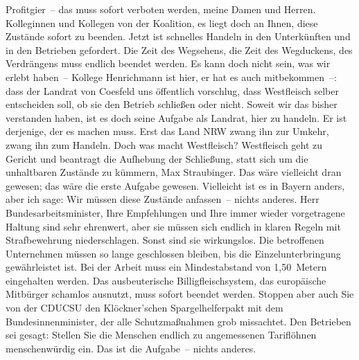 \documentclass{article}
\begin{document}
Profitgier – das muss sofort verboten werden, meine Damen und Herren.  Kolleginnen und Kollegen von der Koalition, es liegt doch an Ihnen, diese Zustände sofort zu beenden.  Jetzt ist schnelles Handeln in den Unterkünften und in den Betrieben gefordert. Die Zeit des Wegsehens, die Zeit des Wegduckens, des Verdrängens muss endlich beendet werden.  Es kann doch nicht sein, was wir erlebt haben – Kollege Henrichmann ist hier, er hat es auch mitbekommen –: dass der Landrat von Coesfeld uns öffentlich vorschlug, dass Westfleisch selber entscheiden soll, ob sie den Betrieb schließen oder nicht. Soweit wir das bisher verstanden haben, ist es doch seine Aufgabe als Landrat, hier zu handeln. Er ist derjenige, der es machen muss.  Erst das Land NRW zwang ihn zur Umkehr, zwang ihn zum Handeln. Doch was macht Westfleisch? Westfleisch geht zu Gericht und beantragt die Aufhebung der Schließung,  statt sich um die unhaltbaren Zustände zu kümmern, Max Straubinger.  Das wäre vielleicht dran gewesen;  das wäre die erste Aufgabe gewesen. Vielleicht ist es in Bayern anders, aber ich sage: Wir müssen diese Zustände anfassen – nichts anderes.  Herr Bundesarbeitsminister, Ihre Empfehlungen und Ihre immer wieder vorgetragene Haltung sind sehr ehrenwert, aber sie müssen sich endlich in klaren Regeln mit Strafbewehrung niederschlagen. Sonst sind sie wirkungslos.  Die betroffenen Unternehmen müssen so lange geschlossen bleiben, bis die Einzelunterbringung gewährleistet ist. Bei der Arbeit muss ein Mindestabstand von 1,50 Metern eingehalten werden. Das ausbeuterische Billigfleischsystem, das europäische Mitbürger schamlos ausnutzt, muss sofort beendet werden.  Stoppen aber auch Sie von der CDU\/CSU den Klöckner’schen Spargelhelferpakt mit dem Bundesinnenminister, der alle Schutzmaßnahmen grob missachtet. Den Betrieben sei gesagt: Stellen Sie die Menschen endlich zu angemessenen Tariflöhnen menschenwürdig ein. Das ist die Aufgabe – nichts anderes.  
\end{document}
